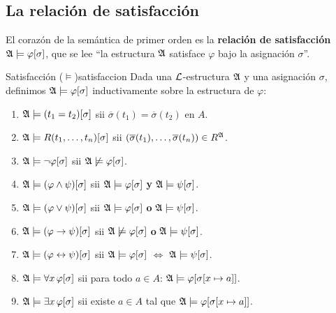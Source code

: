 \subsection{La relación de satisfacción}

El corazón de la semántica de primer orden es la \textbf{relación de satisfacción} $\mathfrak{A} \models \varphi[\sigma]$, que se lee ``la estructura $\mathfrak{A}$ satisface $\varphi$ bajo la asignación $\sigma$''.

\begin{definicion}{Satisfacción ($\models$)}{satisfaccion}
Dada una $\mathcal{L}$-estructura $\mathfrak{A}$ y una asignación $\sigma$, definimos $\mathfrak{A} \models \varphi[\sigma]$ inductivamente sobre la estructura de $\varphi$:

\begin{enumerate}[leftmargin=2em, label=\textbf{(\roman*)}]
  \item $\mathfrak{A} \models (t_1 = t_2)[\sigma]$ \quad sii \quad $\overline{\sigma}(t_1) = \overline{\sigma}(t_2)$ en $A$.
  \item $\mathfrak{A} \models R(t_1,\ldots,t_n)[\sigma]$ \quad sii \quad $(\overline{\sigma}(t_1),\ldots,\overline{\sigma}(t_n)) \in R^{\mathfrak{A}}$.
  \item $\mathfrak{A} \models \neg\varphi[\sigma]$ \quad sii \quad $\mathfrak{A} \not\models \varphi[\sigma]$.
  \item $\mathfrak{A} \models (\varphi \wedge \psi)[\sigma]$ \quad sii \quad $\mathfrak{A} \models \varphi[\sigma]$ \textbf{ y } $\mathfrak{A} \models \psi[\sigma]$.
  \item $\mathfrak{A} \models (\varphi \vee \psi)[\sigma]$ \quad sii \quad $\mathfrak{A} \models \varphi[\sigma]$ \textbf{ o } $\mathfrak{A} \models \psi[\sigma]$.
  \item $\mathfrak{A} \models (\varphi \to \psi)[\sigma]$ \quad sii \quad $\mathfrak{A} \not\models \varphi[\sigma]$ \textbf{ o } $\mathfrak{A} \models \psi[\sigma]$.
  \item $\mathfrak{A} \models (\varphi \leftrightarrow \psi)[\sigma]$ \quad sii \quad $\mathfrak{A} \models \varphi[\sigma]$ $\Leftrightarrow$ $\mathfrak{A} \models \psi[\sigma]$.
  \item $\mathfrak{A} \models \forall x\, \varphi[\sigma]$ \quad sii \quad para todo $a \in A$: $\mathfrak{A} \models \varphi[\sigma[x \mapsto a]]$.
  \item $\mathfrak{A} \models \exists x\, \varphi[\sigma]$ \quad sii \quad existe $a \in A$ tal que $\mathfrak{A} \models \varphi[\sigma[x \mapsto a]]$.
\end{enumerate}
\end{definicion}

